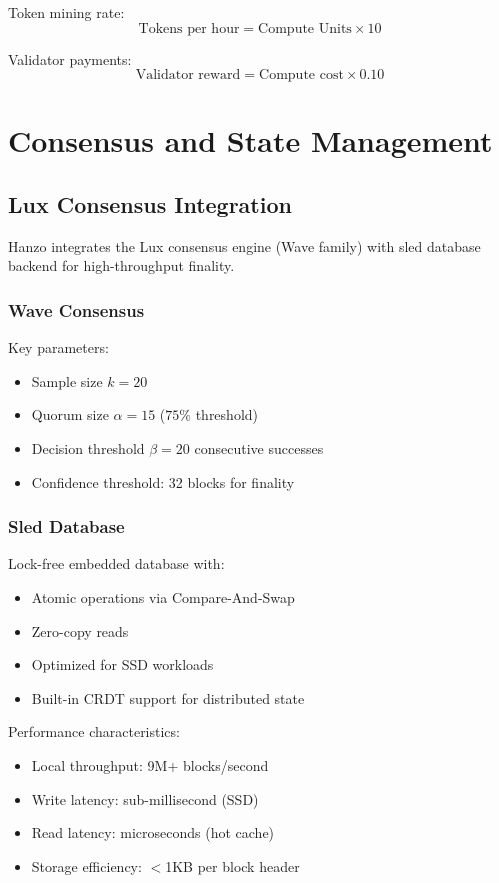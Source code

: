 \documentclass[11pt,twocolumn]{article}
\begin{document}
Token mining rate:
\begin{equation}
\text{Tokens per hour} = \text{Compute Units} \times 10
\end{equation}

Validator payments:
\begin{equation}
\text{Validator reward} = \text{Compute cost} \times 0.10
\end{equation}

\section{Consensus and State Management}

\subsection{Lux Consensus Integration}

Hanzo integrates the Lux consensus engine (Wave family) with sled database backend for high-throughput finality.

\subsubsection{Wave Consensus}

Key parameters:
\begin{itemize}
\item Sample size $k = 20$
\item Quorum size $\alpha = 15$ ($75\%$ threshold)
\item Decision threshold $\beta = 20$ consecutive successes
\item Confidence threshold: 32 blocks for finality
\end{itemize}

\subsubsection{Sled Database}

Lock-free embedded database with:
\begin{itemize}
\item Atomic operations via Compare-And-Swap
\item Zero-copy reads
\item Optimized for SSD workloads
\item Built-in CRDT support for distributed state
\end{itemize}

Performance characteristics:
\begin{itemize}
\item Local throughput: 9M+ blocks/second
\item Write latency: sub-millisecond (SSD)
\item Read latency: microseconds (hot cache)
\item Storage efficiency: $<$1KB per block header
\end{itemize}
\end{document}
